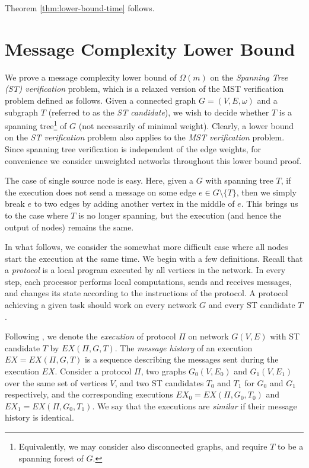 \documentclass[11pt,letter]{article}
\begin{document}
Theorem \ref{thm:lower-bound-time} follows.

\section{Message Complexity Lower Bound}
\label{sec:msg-lb}

We prove a message complexity lower bound of $\Omega(m)$ on the 
{\em Spanning Tree (ST) verification} problem, which is a relaxed version 
of the MST verification problem defined as follows. 
Given a connected graph $G=(V,E,\omega)$ and a subgraph $T$ 
(referred to as the {\em ST candidate}), we wish to decide whether $T$ 
is a spanning tree\footnote{Equivalently, we may consider also disconnected 
graphs, and require $T$ to be a spanning forest of $G$.}
of $G$ (not necessarily of minimal weight). 
Clearly, a lower bound on the {\em ST verification} problem also applies 
to the {\em MST verification} problem. Since spanning tree verification 
is independent of the edge weights, for convenience 
we consider unweighted networks throughout this lower bound proof.

The case of single source node is easy. Here, given a $G$ with spanning tree 
$T$, if the execution does not send a message on some edge 
$e\in G\setminus\{T\}$, then we simply break $e$ to two edges by adding 
another vertex in the middle of $e$. This brings us to the case where $T$ 
is no longer spanning, but the execution (and hence the output of nodes) 
remains the same.

In what follows, we consider the somewhat more difficult case where 
all nodes start the execution at the same time. 
We begin with a few definitions. Recall that a \textit{protocol} is a local 
program executed by all vertices in the network. 
In every step, each processor performs local computations, 
sends and receives messages, and changes its state according to the 
instructions of the protocol. A protocol achieving a given task should work 
on every network $G$  and every ST candidate $T$.

Following \cite{AGVP_90}, we
denote the {\em execution} of protocol $\Pi$ on network $G(V,E)$ with 
ST candidate $T$ by  $EX(\Pi, G, T)$.
The {\em message history} of an execution $EX=EX(\Pi, G, T)$
is a sequence
describing the messages sent during the execution $EX$.
Consider a protocol $\Pi$, two graphs $G_0(V,E_0)$ and $G_1(V,E_1)$ over the 
same set of vertices $V$, and two ST candidates $T_0$ and $T_1$ for $G_0$ 
and $G_1$ respectively, 
and the corresponding executions $EX_0=EX(\Pi, G_0, T_0)$ and 
$EX_1=EX(\Pi, G_0, T_1)$. We say that the executions are {\em similar} 
if their message history is identical.
\end{document}
